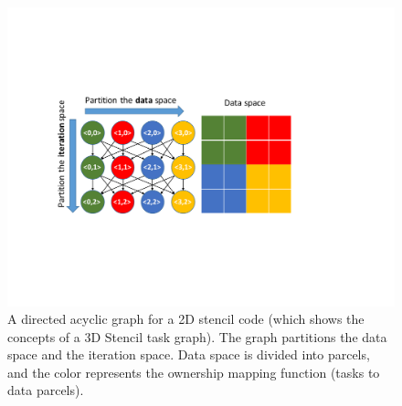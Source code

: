 \begin{figure}[htb]
\centering
\includegraphics[width=.47\textwidth]{figures/taskGraph.pdf}
\caption{A directed acyclic graph for a 2D stencil code (which shows the concepts of a 3D Stencil task graph). The graph partitions the data space and the iteration space. Data space is divided into parcels, and the color represents the ownership mapping function (tasks to data parcels).}
\label{fig:taskGraph}
\end{figure}




